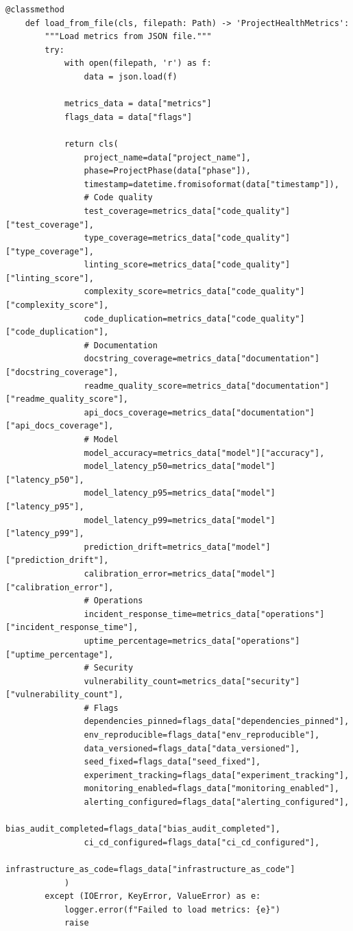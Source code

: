 \begin{lstlisting}[style=python, caption={Comprehensive project health metrics framework with 15+ dimensions}]
    @classmethod
    def load_from_file(cls, filepath: Path) -> 'ProjectHealthMetrics':
        """Load metrics from JSON file."""
        try:
            with open(filepath, 'r') as f:
                data = json.load(f)

            metrics_data = data["metrics"]
            flags_data = data["flags"]

            return cls(
                project_name=data["project_name"],
                phase=ProjectPhase(data["phase"]),
                timestamp=datetime.fromisoformat(data["timestamp"]),
                # Code quality
                test_coverage=metrics_data["code_quality"]["test_coverage"],
                type_coverage=metrics_data["code_quality"]["type_coverage"],
                linting_score=metrics_data["code_quality"]["linting_score"],
                complexity_score=metrics_data["code_quality"]["complexity_score"],
                code_duplication=metrics_data["code_quality"]["code_duplication"],
                # Documentation
                docstring_coverage=metrics_data["documentation"]["docstring_coverage"],
                readme_quality_score=metrics_data["documentation"]["readme_quality_score"],
                api_docs_coverage=metrics_data["documentation"]["api_docs_coverage"],
                # Model
                model_accuracy=metrics_data["model"]["accuracy"],
                model_latency_p50=metrics_data["model"]["latency_p50"],
                model_latency_p95=metrics_data["model"]["latency_p95"],
                model_latency_p99=metrics_data["model"]["latency_p99"],
                prediction_drift=metrics_data["model"]["prediction_drift"],
                calibration_error=metrics_data["model"]["calibration_error"],
                # Operations
                incident_response_time=metrics_data["operations"]["incident_response_time"],
                uptime_percentage=metrics_data["operations"]["uptime_percentage"],
                # Security
                vulnerability_count=metrics_data["security"]["vulnerability_count"],
                # Flags
                dependencies_pinned=flags_data["dependencies_pinned"],
                env_reproducible=flags_data["env_reproducible"],
                data_versioned=flags_data["data_versioned"],
                seed_fixed=flags_data["seed_fixed"],
                experiment_tracking=flags_data["experiment_tracking"],
                monitoring_enabled=flags_data["monitoring_enabled"],
                alerting_configured=flags_data["alerting_configured"],
                bias_audit_completed=flags_data["bias_audit_completed"],
                ci_cd_configured=flags_data["ci_cd_configured"],
                infrastructure_as_code=flags_data["infrastructure_as_code"]
            )
        except (IOError, KeyError, ValueError) as e:
            logger.error(f"Failed to load metrics: {e}")
            raise



\end{lstlisting}
